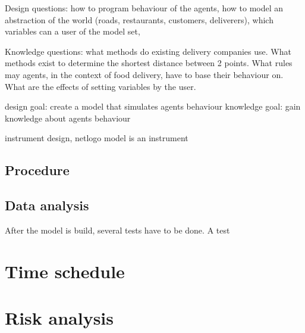 Design questions: how to program behaviour of the agents, how to model an abstraction of the world (roads, restaurants, customers, deliverers),
which variables can a user of the model set,

Knowledge questions: what methods do existing delivery companies use.
What methods exist to determine the shortest distance between 2 points.
What rules may agents, in the context of food delivery, have to base their behaviour on.
What are the effects of setting variables by the user.

design goal: create a model that simulates agents behaviour
knowledge goal: gain knowledge about agents behaviour

instrument design, netlogo model is an instrument
\subsection{Procedure}

\subsection{Data analysis}
After the model is build, several tests have to be done.
A test

\section{Time schedule}


\section{Risk analysis}










